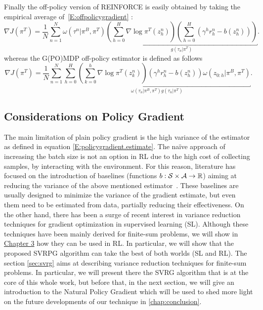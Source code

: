 Finally the off-policy version of REINFORCE is easily obtained by taking the empirical average of~\eqref{E:offpolicygradient} \citep{mastrangelo2015study}:
\[
\nabla J(\pi^T) = \frac{1}{N} \sum_{n=1}^{N} \omega(\tau^n|\pi^B, \pi^T)
\underbracket{
	\left(\sum_{h=0}^{H} \nabla \log \pi^{T}(z_h^n) \right)\left(\sum_{h=0}^{H}\left(\gamma^h r_h^n - b(z_h^n)\right)\right)
}_{g(\tau_n|\pi^T)}.
\]
whereas the G(PO)MDP off-policy estimator is defined as follows \citep{mastrangelo2015study}
\[
\nabla J(\pi^T) = \frac{1}{N} \sum_{n=1}^{N}
\underbracket{
	\sum_{h=0}^H \left(\sum_{k=0}^h \nabla \log\pi^T(z_k^n)\right) \left(\gamma^h r_h^n - b(z_h^n)\right) \omega(z_{0:h}|\pi^B,\pi^T)
}_{\omega(\tau_n|\pi^B,\pi^T)g(\tau_n|\pi^T)}.
\]
\subsection{Considerations on Policy Gradient}
The main limitation of plain policy gradient is the high variance of the estimator as defined in equation \ref{E:policygradient.estimate}.
The na\"ive approach of increasing the batch size is not an option in \acs{RL} due to the high cost of collecting samples, \ie by interacting with the environment.
For this reason, literature has focused on the introduction of baselines (\ie functions $b : \mathcal{S} \times \mathcal{A} \to \mathbb R$) aiming at reducing the variance of the above mentioned estimator~\citep[\eg][]{williams1992simple,Peters2008reinf,Thomas2017actionbaseline,wu2018variance}.
These baselines are usually designed to minimize the variance of the gradient estimate, but even them need to be estimated from data, partially reducing their effectiveness.
On the other hand, there has been a surge of recent interest in variance reduction techniques for gradient optimization in supervised learning (\acs{SL}).
Although these techniques have been mainly derived for finite-sum problems, we will show in \hyperref[chap:svrpg]{Chapter 3} how they can be used in \acs{RL}.
In particular, we will show that the proposed \acs{SVRPG} algorithm can take the best of both worlds (\ie \acs{SL} and \acs{RL}).
The section \ref{sec:svrg} aims at describing variance reduction techniques for finite-sum problems. In particular, we will present there the \acs{SVRG} algorithm that is at the core of this whole work, but before that, in the next section, we will give an introduction to the Natural Policy Gradient which will be used to shed more light on the future developments of our technique in \ref{chap:conclusion}.


